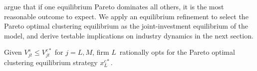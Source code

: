 \documentclass[nogrid,nosurname,sort&compress]{RFS}
\begin{document}


\cite{fudenberg1985} argue that if one equilibrium Pareto dominates all others, it is the most
reasonable outcome to expect. We apply an equilibrium refinement to select the Pareto optimal
clustering equilibrium as the joint-investment equilibrium of the model, and derive testable
implications on industry dynamics in the next section.
\begin{assumption}\label{a1} Given $V_{jt}^{s}\leq V_{jt}^{c\ast }$ for
$j=L,M$, firm $L$\ rationally opts for the Pareto optimal clustering equilibrium strategy
$x_{L}^{c\ast }$.
\end{assumption}

\enlargethispage{-3pt}
\end{document}
